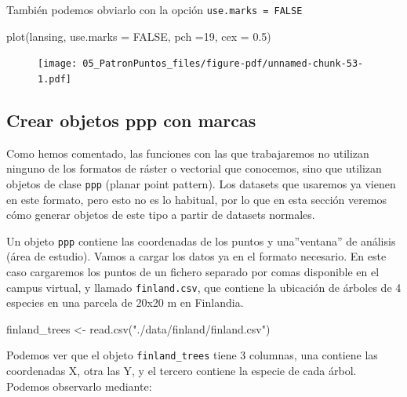 \documentclass[
  letterpaper,
  DIV=11,
  numbers=noendperiod]{scrreprt}
\newenvironment{Shaded}{\begin{snugshade}}{\end{snugshade}}
\newcommand{\AttributeTok}[1]{\textcolor[rgb]{0.40,0.45,0.13}{#1}}
\newcommand{\ConstantTok}[1]{\textcolor[rgb]{0.56,0.35,0.01}{#1}}
\newcommand{\DecValTok}[1]{\textcolor[rgb]{0.68,0.00,0.00}{#1}}
\newcommand{\FloatTok}[1]{\textcolor[rgb]{0.68,0.00,0.00}{#1}}
\newcommand{\FunctionTok}[1]{\textcolor[rgb]{0.28,0.35,0.67}{#1}}
\newcommand{\NormalTok}[1]{\textcolor[rgb]{0.00,0.23,0.31}{#1}}
\newcommand{\OtherTok}[1]{\textcolor[rgb]{0.00,0.23,0.31}{#1}}
\newcommand{\StringTok}[1]{\textcolor[rgb]{0.13,0.47,0.30}{#1}}
\begin{document}
También podemos obviarlo con la opción \texttt{use.marks\ =\ FALSE}

\begin{Shaded}
\begin{Highlighting}[]
\FunctionTok{plot}\NormalTok{(lansing, }\AttributeTok{use.marks =} \ConstantTok{FALSE}\NormalTok{, }\AttributeTok{pch =}\DecValTok{19}\NormalTok{, }\AttributeTok{cex =} \FloatTok{0.5}\NormalTok{)}
\end{Highlighting}
\end{Shaded}

\begin{figure}[H]

{\centering \texttt{[image: 05\_PatronPuntos\_files/figure-pdf/unnamed-chunk-53-1.pdf]}

}

\end{figure}

\hypertarget{crear-objetos-ppp-con-marcas}{%
\subsection{Crear objetos ppp con
marcas}\label{crear-objetos-ppp-con-marcas}}

Como hemos comentado, las funciones con las que trabajaremos no utilizan
ninguno de los formatos de ráster o vectorial que conocemos, sino que
utilizan objetos de clase \texttt{ppp} (planar point pattern). Los
datasets que usaremos ya vienen en este formato, pero esto no es lo
habitual, por lo que en esta sección veremos cómo generar objetos de
este tipo a partir de datasets normales.

Un objeto \texttt{ppp} contiene las coordenadas de los puntos y
una''ventana'' de análisis (área de estudio). Vamos a cargar los datos
ya en el formato necesario. En este caso cargaremos los puntos de un
fichero separado por comas disponible en el campus virtual, y llamado
\texttt{finland.csv}, que contiene la ubicación de árboles de 4 especies
en una parcela de 20x20 m en Finlandia.

\begin{Shaded}
\begin{Highlighting}[]
\NormalTok{finland\_trees }\OtherTok{\textless{}{-}} \FunctionTok{read.csv}\NormalTok{(}\StringTok{"./data/finland/finland.csv"}\NormalTok{)}
\end{Highlighting}
\end{Shaded}

Podemos ver que el objeto \texttt{finland\_trees} tiene 3 columnas, una
contiene las coordenadas X, otra las Y, y el tercero contiene la especie
de cada árbol. Podemos observarlo mediante:
\end{document}
